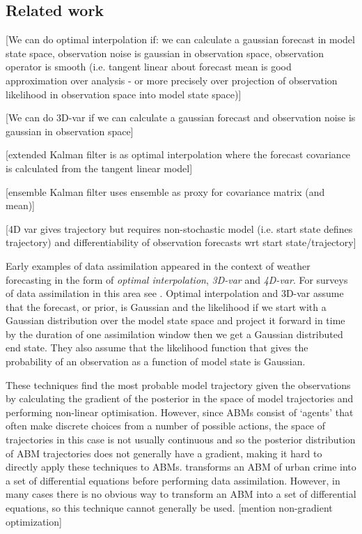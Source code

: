 \documentclass{article}
\begin{document}
\subsection{Related work}

[We can do optimal interpolation if: we can calculate a gaussian forecast in model state space, observation noise is gaussian in observation space, observation operator is smooth (i.e. tangent linear about forecast mean is good approximation over analysis - or more precisely over projection of observation likelihood in observation space into model state space)]

[We can do 3D-var if we can calculate a gaussian forecast and observation noise is gaussian in observation space]

[extended Kalman filter is as optimal interpolation where the forecast covariance is calculated from the tangent linear model]

[ensemble Kalman filter uses ensemble as proxy for covariance matrix (and mean)]

[4D var gives trajectory but requires non-stochastic model (i.e. start state defines trajectory) and differentiability of observation forecasts wrt start state/trajectory]

Early examples of data assimilation appeared in the context of weather forecasting in the form of \textit{optimal interpolation}\citep{sasaki1958objective}, \textit{3D-var}\citep{lorenc1986analysis} and \textit{4D-var}\citep{courtier1990variational}. For surveys of data assimilation in this area see \citet*{carrassi2018data, talagrand_assimilation_1997, kalnay_atmospheric_2003, lewis_dynamic_2006}. Optimal interpolation and 3D-var assume that  the forecast, or prior, is Gaussian and the likelihood  if we start with a Gaussian distribution over the model state space and project it forward in time by the duration of one assimilation window then we get a Gaussian distributed end state. They also assume that the likelihood function that gives the probability of an observation as a function of model state is Gaussian.

These techniques find the most probable model trajectory given the observations by calculating the gradient of the posterior in the space of model trajectories and performing non-linear optimisation. However, since ABMs consist of `agents' that often make discrete choices from a number of possible actions, the space of trajectories in this case is not usually continuous and so the posterior distribution of ABM trajectories does not generally have a gradient, making it hard to directly apply these techniques to ABMs. \citet{lloyd_exploring_2016} transforms an ABM of urban crime into a set of differential equations before performing data assimilation. However, in many cases there is no obvious way to transform an ABM into a set of differential equations, so this technique cannot generally be used. [mention non-gradient optimization]
\end{document}
